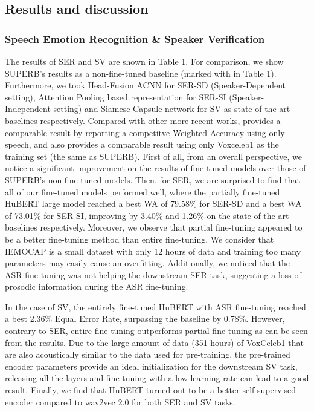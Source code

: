 \documentclass{article}
\begin{document}
\subsection{Results and discussion}
\subsubsection{Speech Emotion Recognition \& Speaker Verification}
The results of SER and SV are shown in Table 1. For comparison, we show SUPERB's results as a non-fine-tuned baseline (marked with \cite{superb} in Table 1). Furthermore, we took Head-Fusion ACNN \cite{head-fusion} for SER-SD (Speaker-Dependent setting), Attention Pooling based representation \cite{attention_pooling} for SER-SI (Speaker-Independent setting) and Siamese Capsule network \cite{siamese} for SV as state-of-the-art baselines respectively. Compared with other more recent works, \cite{attention_pooling} provides a comparable result by reporting a competitve Weighted Accuracy using only speech, and \cite{siamese} also provides a comparable result using only Voxceleb1 as the training set (the same as SUPERB). First of all, from an overall perspective, we notice a significant improvement on the results of fine-tuned models over those of SUPERB's non-fine-tuned models. Then, for SER, we are surprised to find that all of our fine-tuned models performed well, where the partially fine-tuned HuBERT large model reached a best WA of 79.58\% for SER-SD and a best WA of 73.01\% for SER-SI, improving by 3.40\% and 1.26\% on the state-of-the-art baselines respectively. Moreover, we observe that partial fine-tuning appeared to be a better fine-tuning method than entire fine-tuning. We consider that IEMOCAP is a small dataset with only 12 hours of data and training too many parameters may easily cause an overfitting. Additionally, we noticed that the ASR fine-tuning was not helping the downstream SER task, suggesting a loss of prosodic information during the ASR fine-tuning. 

In the case of SV, the entirely fine-tuned HuBERT with ASR fine-tuning reached a best 2.36\% Equal Error Rate, surpassing the baseline by 0.78\%. However, contrary to SER, entire fine-tuning outperforms partial fine-tuning as can be seen from the results. Due to the large amount of data (351 hours) of VoxCeleb1 that are also acoustically similar to the data used for pre-training, the pre-trained encoder parameters provide an ideal initialization for the downstream SV task, releasing all the layers and fine-tuning with a low learning rate can lead to a good result. Finally, we find that HuBERT turned out to be a better self-supervised encoder compared to wav2vec 2.0 for both SER and SV tasks.
\end{document}
